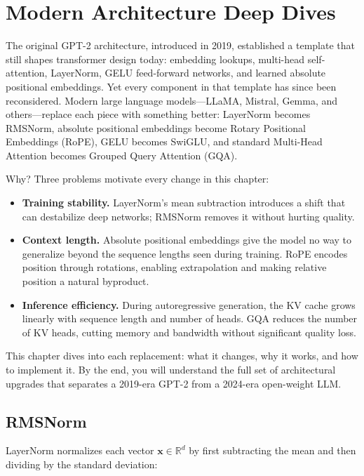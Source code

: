 \chapter{Modern Architecture Deep Dives}

The original GPT-2 architecture, introduced in 2019, established a template
that still shapes transformer design today: embedding lookups, multi-head
self-attention, LayerNorm, GELU feed-forward networks, and learned absolute
positional embeddings. Yet every component in that template has since been
reconsidered. Modern large language models---LLaMA, Mistral, Gemma, and
others---replace each piece with something better: LayerNorm becomes RMSNorm,
absolute positional embeddings become Rotary Positional Embeddings (RoPE),
GELU becomes SwiGLU, and standard Multi-Head Attention becomes Grouped Query
Attention (GQA).

Why? Three problems motivate every change in this chapter:

\begin{itemize}
  \item \textbf{Training stability.} LayerNorm's mean subtraction introduces
        a shift that can destabilize deep networks; RMSNorm removes it without
        hurting quality.
  \item \textbf{Context length.} Absolute positional embeddings give the model
        no way to generalize beyond the sequence lengths seen during training.
        RoPE encodes position through rotations, enabling extrapolation and
        making relative position a natural byproduct.
  \item \textbf{Inference efficiency.} During autoregressive generation, the
        KV cache grows linearly with sequence length and number of heads. GQA
        reduces the number of KV heads, cutting memory and bandwidth without
        significant quality loss.
\end{itemize}

This chapter dives into each replacement: what it changes, why it works, and
how to implement it. By the end, you will understand the full set of
architectural upgrades that separates a 2019-era GPT-2 from a 2024-era
open-weight LLM.

\section{RMSNorm}

LayerNorm normalizes each vector $\mathbf{x} \in \mathbb{R}^d$ by first
subtracting the mean and then dividing by the standard deviation:

